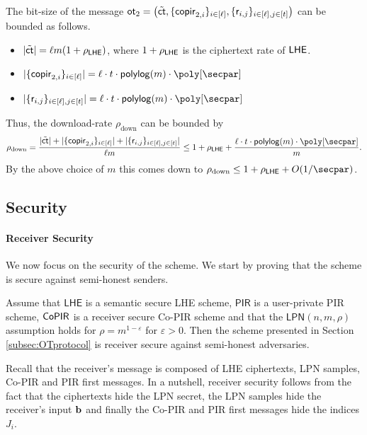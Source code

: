 The bit-size of the message $\mathsf{ot}_2=\left(\tilde{\mathsf{ct}},\{\mathsf{copir}_{2,i}\}_{i\in[\ell]}, \{\mathsf{r}_{i,j}\}_{i \in [\ell], j \in [t]} \right)$ can be bounded as follows.
\begin{itemize}
    \item $|\tilde{\mathsf{ct}}| = \ell m (1 + \rho_{\mathsf{LHE}})$, where $1 + \rho_{\mathsf{LHE}}$ is the ciphertext rate of $\mathsf{LHE}$.
    \item $|\{\copir_{2,i}\}_{i\in[ \ell]}|= \ell \cdot  t\cdot\mathsf{polylog}(m) \cdot \poly[\secpar]$
    \item $|\{\resp_{i,j}\}_{i \in [\ell], j \in [t]}| = \ell \cdot    t\cdot\mathsf{polylog}(m) \cdot \poly[\secpar]$
\end{itemize}
Thus, the download-rate $\rho_{\text{down}}$ can be bounded by
\[
\rho_{\text{down}} = \frac{|\tilde{\ct}|+|\{\copir_{2,i}\}_{i\in[ \ell]}| + |\{\resp_{i,j}\}_{i \in [\ell], j \in [t]}| }{\ell m} \leq 1 + \rho_{\LHE} + \frac{\ell\cdot  t\cdot\mathsf{polylog}(m) \cdot \poly[\secpar]}{m}.
\]
By the above choice of $m$ this comes down to $\rho_{\text{down}} \leq 1 + \rho_{\LHE} + O(1/\secpar)$.

\subsection{Security}

\paragraph{Receiver Security}
We now focus on the security of the scheme. We start by proving that the scheme is secure against semi-honest senders.

\begin{theorem}
\label{theor:ReceiverSecOT}
Assume that $\mathsf{LHE}$ is a semantic secure LHE scheme, $\mathsf{PIR}$ is a user-private PIR scheme, $\mathsf{CoPIR}$ is a receiver secure Co-PIR scheme and that the $\mathsf{LPN}(n,m,\rho)$ assumption holds for $\rho=m^{1-\varepsilon}$ for $\varepsilon>0$. Then the scheme presented in Section \ref{subsec:OTprotocol} is receiver secure against semi-honest adversaries.
\end{theorem}

Recall that the receiver's message is composed of LHE ciphertexts, LPN samples, Co-PIR and PIR first messages. In a nutshell, receiver security follows from the fact that the ciphertexts hide the LPN secret, the LPN samples hide the receiver's input $\mathbf{b}$ and finally the Co-PIR and PIR first messages hide the indices $J_i$.

